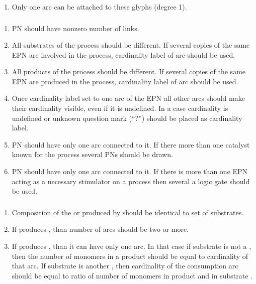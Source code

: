  \begin{enumerate}
    \item Only one arc can be attached to these glyphs (degree 1).
  \end{enumerate}

\subsubsection{}
 \begin{enumerate}
   \item PN should have nonzero number of  links.
    \item All substrates of the process should be different. If several 
    copies of the same EPN are involved in the process, cardinality label of 
     arc should be used.
    \item All products of the process should be different. If several copies 
    of the same EPN are produced in the process, cardinality label of 
     arc should be used.
    \item Once cardinality label set to one arc of the EPN all other arcs should
    make their cardinality visible, even if it is undefined. In a case
    cardinality is undefined or unknown question mark (``?'') should be placed as cardinality label. 
    \item PN should have only one  arc connected to it. If
    there more than one catalyst known for the process several PNs should be
    drawn. 
    \item PN should have only one  arc connected to it. If
    there is more than one EPN acting as a necessary stimulator on a process then several a logic gate should be used.    \end{enumerate}  

\subsubsection{}

  \begin{enumerate}
    \item Composition of the  or  produced by
     should be identical to set of  substrates.
    \item If  produces , than number of 
     arcs should be two or more.
    \item If  produces , than it can have only one 
     arc. In that case if substrate is not a
    , then the number of monomers in a product 
    should be equal to cardinality of that arc. If substrate is another
    , then cardinality of the consumption arc should be equal to
    ratio of number of monomers in product and in substrate .
  \end{enumerate}  

